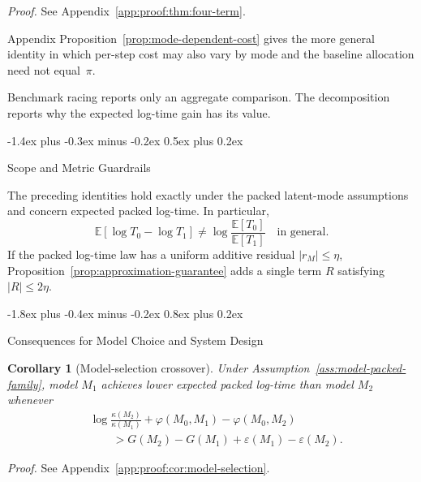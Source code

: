 \documentclass[10pt,twocolumn]{article}
\makeatletter
\theoremstyle{paperplain}
\newtheorem{corollary}[theorem]{Corollary}
\theoremstyle{paperdefinition}
\theoremstyle{paperremark}
\renewcommand{\section}{%
  \@startsection{section}{1}{\z@}%
    {-1.8ex plus -0.4ex minus -0.2ex}%
    {0.8ex plus 0.2ex}%
    {\normalfont\large\bfseries\raggedright}}
\renewcommand{\subsection}{%
  \@startsection{subsection}{2}{\z@}%
    {-1.4ex plus -0.3ex minus -0.2ex}%
    {0.5ex plus 0.2ex}%
    {\normalfont\normalsize\bfseries\raggedright}}
\newcommand{\E}{\mathbb{E}}
\makeatother
\begin{document}
\par\noindent\emph{Proof.} See Appendix~\ref{app:proof:thm:four-term}.\par

Appendix Proposition~\ref{prop:mode-dependent-cost} gives the more general identity in which per-step cost may also vary by mode and the baseline allocation need not equal~$\pi$.


Benchmark racing reports only an aggregate comparison. The decomposition reports why the expected log-time gain has its value.

\subsection{Scope and Metric Guardrails}
\label{subsec:guardrails}

The preceding identities hold exactly under the packed latent-mode assumptions
and concern expected packed log-time.  In particular,
\[
\E[\log T_0-\log T_1]\neq \log\frac{\E[T_0]}{\E[T_1]}
\quad\text{in general.}
\]
If the packed log-time law has a uniform additive residual
$|r_M|\le\eta$, Proposition~\ref{prop:approximation-guarantee} adds a single
term $R$ satisfying $|R|\le2\eta$.


\section{Consequences for Model Choice and System Design}
\label{sec:consequences}

\begin{corollary}[Model-selection crossover]
\label{cor:model-selection}
Under Assumption~\ref{ass:model-packed-family}, model $M_1$ achieves lower
expected packed log-time than model $M_2$ whenever
\begin{equation}
\label{eq:crossover}
\begin{aligned}
&
\log\frac{\kappa(M_2)}{\kappa(M_1)}
+\varphi(M_0,M_1)-\varphi(M_0,M_2)
\\[-1pt]
&\qquad>G(M_2)-G(M_1)
+\varepsilon(M_1)-\varepsilon(M_2).
\end{aligned}
\end{equation}
\end{corollary}

\par\noindent\emph{Proof.} See Appendix~\ref{app:proof:cor:model-selection}.\par
\end{document}
